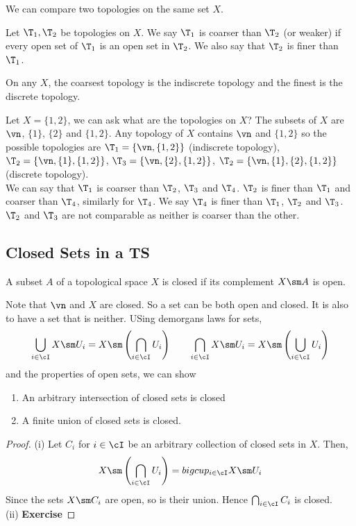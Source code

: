 
We can compare two topologies on the same set $X$.
\begin{ndefi}
  Let $\T_1, \T_2$ be topologies on $X$. We say $\T_1$ is coarser than $\T_2$ (or weaker) if every open set of $\T_1$ is an open set in $\T_2$. We also say that $\T_2$ is finer than $\T_1$.
\end{ndefi}
On any $X$, the coarsest topology is the indiscrete topology and the finest is the discrete topology.

\begin{eg}
  Let $X = \{1, 2\}$, we can ask what are the topologies on $X$? The subsets of $X$ are $\vn$, $\{1\}$, $\{2\}$ and $\{1, 2\}$. Any topology of $X$ contains $\vn$ and $\{1, 2\}$ so the possible topologies are $\T_1 = \{\vn, \{1, 2\}\}$ (indiscrete topology), $\T_2 = \{\vn, \{1\}, \{1, 2\}\}$, $\T_3 = \{\vn, \{2\}, \{1, 2\}\}$, $\T_2 = \{\vn, \{1\}, \{2\}, \{1, 2\}\}$ (discrete topology).\\

  \noindent
  We can say that $\T_1$ is coarser than $\T_2$, $\T_3$ and $\T_4$. $\T_2$ is finer than $\T_1$ and coarser than $\T_4$, similarly for $\T_4$. We say $\T_4$ is finer than $\T_1$, $\T_2$ and $\T_3$. $\T_2$ and $\T_3$ are not comparable as neither is coarser than the other.
\end{eg}

\subsection{Closed Sets in a TS}
\begin{ndefi}[Closed]
  A subset $A$ of a topological space $X$ is closed if its complement $X\sm A$ is open.
\end{ndefi}
Note that $\vn$ and $X$ are closed. So a set can be both open and closed. It is also to have a set that is neither. USing demorgans laws for sets,
$$ \bigcup_{i \in \cI} X \sm U_i = X\sm \left( \bigcap_{i \in \cI} U_i \right) \qquad \bigcap_{i \in \cI} X \sm U_i = X \sm \left( \bigcup_{i \in \cI} U_i \right) $$
and the properties of open sets, we can show

\begin{nprop}
   \begin{enumerate}
     \item An arbitrary intersection of closed sets is closed
     \item A finite union of closed sets is closed.
   \end{enumerate}
\end{nprop}
\begin{proof}
  (i) Let $C_i$ for $i \in \cI$ be an arbitrary collection of closed sets in $X$. Then,
  $$ X\sm \left( \bigcap_{i \in \cI} U_i \right) = bigcup_{i \in \cI} X \sm U_i $$
  Since the sets $X\sm C_i$ are open, so is their union. Hence $\bigcap_{i \in \cI} C_i$ is closed.\\

  \noindent
  (ii) \textbf{Exercise}
\end{proof}

